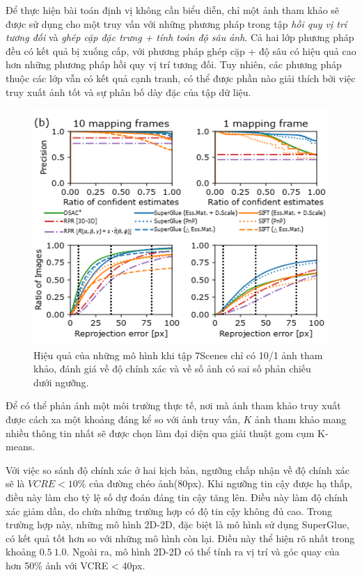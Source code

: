 Để thực hiện bài toán định vị không cần biểu diễn, chỉ một ảnh tham khảo sẽ được sử dụng cho một truy vấn với những phương pháp trong tập \textit{hồi quy vị trí tương đối} và \textit{ghép cặp đặc trưng + tính toán độ sâu ảnh}. Cả hai lớp phương pháp đều có kết quả bị xuống cấp, với phương pháp ghép cặp + độ sâu có hiệu quả cao hơn những phương pháp hồi quy vị trí tương đối. Tuy nhiên, các phương pháp thuộc các lớp vẫn có kết quả cạnh tranh, có thể được phần nào giải thích bởi việc truy xuất ảnh tốt và sự phân bố dày đặc của tập dữ liệu.

\begin{figure}[H]
  \centering
  \includegraphics[scale=0.8]{pics/Proposal/partial_7scene.png}
  \caption[Hiệu quả của các mô hình khi giới hạn ảnh tham khảo]{Hiệu quả của những mô hình khi tập 7Scenes chỉ có 10/1 ảnh tham khảo, đánh giá về độ chính xác và về số ảnh có sai số phản chiếu dưới ngưỡng.}
\end{figure}

Để có thể phản ánh một môi trường thực tế, nơi mà ảnh tham khảo truy xuất được cách xa một khoảng đáng kể so với ảnh truy vấn, $K$ ảnh tham khảo mang nhiều thông tin nhất sẽ được chọn làm đại diện qua giải thuật gom cụm K-means.

Với việc so sánh độ chính xác ở hai kịch bản, ngưỡng chấp nhận về độ chính xác sẽ là $VCRE<10\%$ của đường chéo ảnh(80px). Khi ngưỡng tin cậy được hạ thấp, điều này làm cho tỷ lệ số dự đoán đáng tin cậy tăng lên. Điều này làm độ chính xác giảm dần, do chứa những trường hợp có độ tin cậy không đủ cao. Trong trường hợp này, những mô hình 2D-2D, đặc biệt là mô hình sử dụng SuperGlue, có kết quả tốt hơn so với những mô hình còn lại. Điều này thể hiện rõ nhất trong khoảng $0.5~1.0$. Ngoài ra, mô hình 2D-2D có thể tính ra vị trí và góc quay của hơn 50\% ảnh với VCRE < 40px.


